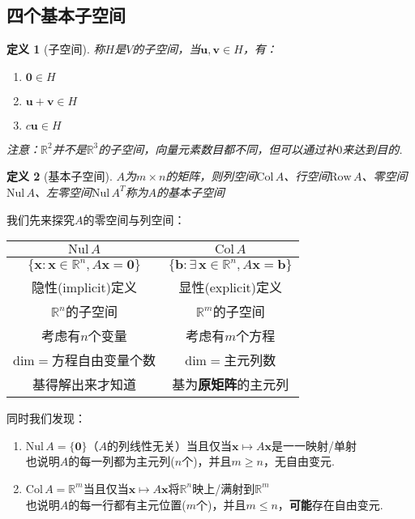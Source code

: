 \documentclass[11pt,UTF8]{ctexart}
\newtheorem{definition}{定义}
\def\vv{\mathbf{v}}
\def\vu{\mathbf{u}}
\def\col{\mathrm{Col}\,}
\def\nul{\mathrm{Nul}\,}
\def\row{\mathrm{Row}\,}
\begin{document}
\subsection{四个基本子空间}
\begin{definition}[子空间]
称$H$是$V$的子空间，当$\vu,\vv\in H$，有：
\begin{enumerate}
	\itemsep -5pt
	\item $\mathbf{0}\in H$
	\item $\vu+\vv\in H$
	\item $c\vu\in H$
\end{enumerate}
注意：$\mathbb{R}^2$并不是$\mathbb{R}^3$的子空间，向量元素数目都不同，但可以通过补$0$来达到目的.
\end{definition}
\begin{definition}[基本子空间]
$A$为$m\times n$的矩阵，则列空间$\col A$、行空间$\row A$、零空间$\nul A$、左零空间$\nul A^T$称为$A$的基本子空间
\end{definition}
\label{nul_and_col}
我们先来探究$A$的零空间与列空间：
\renewcommand\arraystretch{1.2}
\begin{table}[!htbp]%
\begin{center}
\begin{tabular}{|c|c|}
\hline
$\nul A$ & $\col A$ \\ \hline
$\{\mathbf{x}:\mathbf{x}\in\mathbb{R}^n,A\mathbf{x}=\mathbf{0}\}$ & $\{\mathbf{b}:\exists\,\mathbf{x}\in\mathbb{R}^n,A\mathbf{x}=\mathbf{b}\}$\\ \hline
隐性(implicit)定义 & 显性(explicit)定义 \\ \hline
$\mathbb{R}^n$的子空间 & $\mathbb{R}^m$的子空间\\ \hline
考虑有$n$个变量 & 考虑有$m$个方程\\ \hline
$\mathrm{dim}=$方程自由变量个数 & $\mathrm{dim}=$主元列数 \\ \hline
基得解出来才知道 & 基为\textbf{原矩阵}的主元列\\
\hline
\end{tabular}
\end{center}
\end{table}
\renewcommand\arraystretch{1}
\par 同时我们发现：
\begin{enumerate}
	\itemsep -3pt
	\item $\mathrm{Nul}\, A=\{\mathbf{0}\}$（$A$的列线性无关）当且仅当$\mathbf{x}\mapsto A\mathbf{x}$是一一映射/单射\\
		也说明$A$的每一列都为主元列($n$个)，并且$m\geq n$，无自由变元.
	\item $\mathrm{Col}\, A=\mathbb{R}^m$当且仅当$\mathbf{x}\mapsto A\mathbf{x}$将$\mathbb{R}^n$映上/满射到$\mathbb{R}^m$\\
		也说明$A$的每一行都有主元位置($m$个)，并且$m\leq n$，\textbf{可能}存在自由变元.
\end{enumerate}
\end{document}
